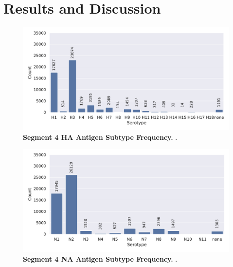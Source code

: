 \chapter{Results and Discussion} \label{chap:Results_and_Discussion}

\begin{figure}[!hbt]
    \centering
    \includegraphics[width=\dimexpr\textwidth-2\fboxsep-2\fboxrule,fbox]{PCA/Data_Overview_Segment_4_H.pdf}
    \caption[Segment 4 \Acrlong{HA} Antigen Subtype Frequency]{\textbf{Segment 4 \Acrlong{HA} Antigen Subtype Frequency.} .}
    \label{fig:Frequency_4}
\end{figure}

\begin{figure}[!hbt]
    \centering
    \includegraphics[width=\dimexpr\textwidth-2\fboxsep-2\fboxrule,fbox]{PCA/Data_Overview_Segment_6_N.pdf}
    \caption[Segment 6 \Acrlong{NA} Antigen Subtype Frequency]{\textbf{Segment 4 \Acrlong{NA} Antigen Subtype Frequency.} .}
    \label{fig:Frequency_6}
\end{figure}













